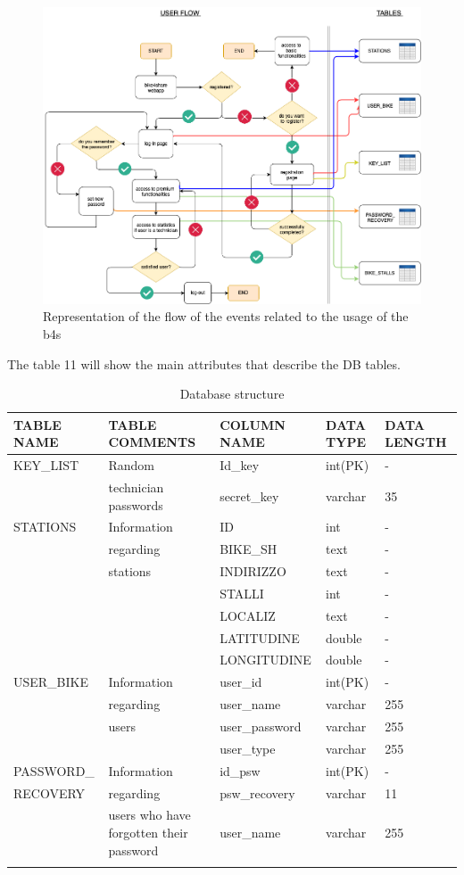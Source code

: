 \documentclass{article}
\begin{document}
\begin{figure}[H]
    \centering
    \includegraphics[width=0.99\linewidth]{image/flowchart.png}
    \caption{Representation of the flow of the events related to the usage of the b4s}
    \label{fig:flow}
\end{figure}

The table 11 will show the main attributes that describe the DB tables.
\\ 
\begin{longtable}{|p{}|p{}|l|p{}|p{}|}
 \hline TABLE NAME &   TABLE COMMENTS &    COLUMN NAME & DATA TYPE & DATA LENGTH    \\
 \hline
 KEY\_LIST &  Random  & Id\_key &int(PK)& - \\ 
 & technician passwords &  secret\_key & varchar & 35 \\
 \hline
 STATIONS  &   Information   & ID &int & - \\
  & regarding & BIKE\_SH & text & - \\
  & stations & INDIRIZZO & text & - \\
  & & STALLI & int & - \\
  \hline
  \hline
  & & LOCALIZ & text & - \\
  & & LATITUDINE & double & - \\
  & & LONGITUDINE & double & - \\
 \hline
 USER\_BIKE &  Information & user\_id & int(PK)& -\\
 & regarding & user\_name & varchar & 255 \\
 & users & user\_password & varchar & 255 \\
 & & user\_type & varchar & 255\\
 \hline 
 PASSWORD\_ &  Information  & id\_psw & int(PK)& -\\
 RECOVERY & regarding & psw\_recovery & varchar & 11 \\
 & users who have forgotten their password & user\_name & varchar & 255 \\
 \hline
\caption{Database structure} \\
\end{longtable}
\end{document}
